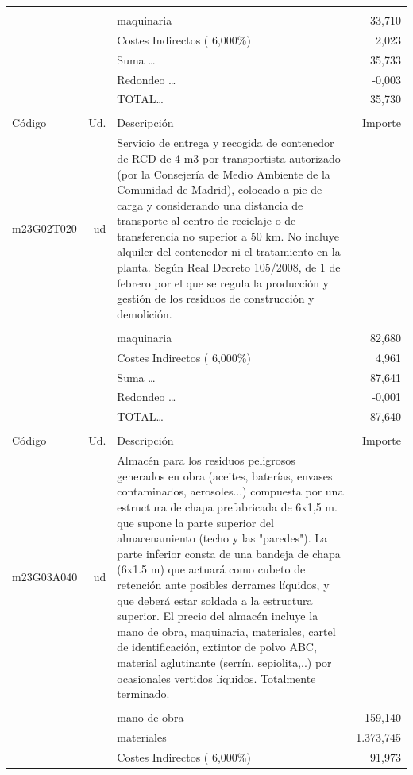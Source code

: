 \documentclass{book}%
\begin{document}
\begin{supertabular}{l r p{60mm} r}
&&&\\%
&&maquinaria&    33,710\\%
&&Costes Indirectos (     6,000\%)&     2,023\\%
&&Suma \ldots&    35,733\\%
&&Redondeo \ldots&    {-}0,003\\%
%
&&TOTAL\ldots&    35,730\\%
&&&\\%
Código&Ud.&Descripción&Importe\\%
\hline%
m23G02T020&ud&Servicio de entrega y recogida de contenedor de RCD de 4 m3 por transportista autorizado (por la Consejería de Medio Ambiente de la Comunidad de Madrid), colocado a pie de carga y considerando una distancia de transporte al centro de reciclaje o de transferencia no superior a 50 km. No incluye alquiler del contenedor ni el tratamiento en la planta. Según Real Decreto 105/2008, de 1 de febrero por el que se regula la producción y gestión de los residuos de construcción y demolición.&\\%
&&&\\%
&&maquinaria&    82,680\\%
&&Costes Indirectos (     6,000\%)&     4,961\\%
&&Suma \ldots&    87,641\\%
&&Redondeo \ldots&    {-}0,001\\%
%
&&TOTAL\ldots&    87,640\\%
&&&\\%
Código&Ud.&Descripción&Importe\\%
\hline%
m23G03A040&ud&Almacén para los residuos peligrosos generados en obra (aceites, baterías, envases contaminados, aerosoles...) compuesta por una estructura de chapa prefabricada de 6x1,5 m. que supone la parte superior del almacenamiento (techo y las "paredes"). La parte inferior consta de una bandeja de chapa (6x1.5 m) que actuará como cubeto de retención ante posibles derrames líquidos, y que deberá estar soldada a la estructura superior. El precio del almacén incluye la mano de obra, maquinaria, materiales, cartel de identificación, extintor de polvo ABC, material aglutinante (serrín, sepiolita,..) por ocasionales vertidos líquidos. Totalmente terminado.&\\%
&&&\\%
&&mano de obra&   159,140\\%
&&materiales& 1.373,745\\%
&&Costes Indirectos (     6,000\%)&    91,973\\%

\end{supertabular}
\end{document}
